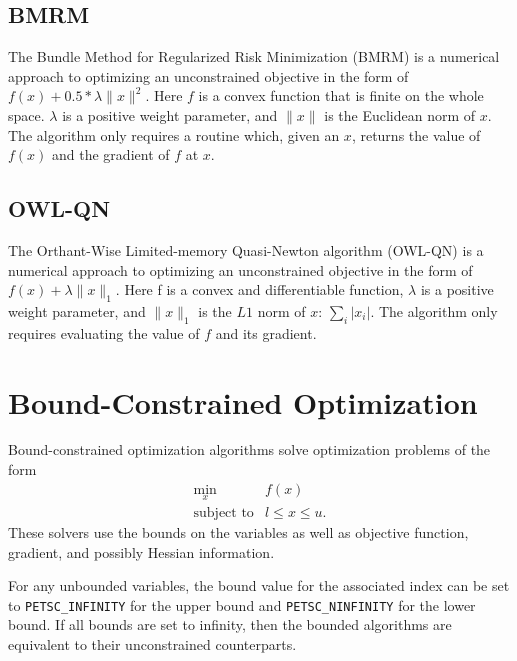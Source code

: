 \documentclass[]{book}
\begin{document}
\subsection{BMRM}%
The Bundle Method for Regularized Risk Minimization (BMRM)\cite{brmrm} is a 
numerical approach to optimizing an unconstrained objective in the form of 
$f(x) + 0.5 * \lambda \| x \|^2$.  Here $f$ is a convex function that is finite on 
the whole space.  $\lambda$ is a positive 
weight parameter, and $\| x \|$ is the Euclidean norm of $x$.  The algorithm only 
requires a routine which, given an $x$, returns the value of $f(x)$ and the 
gradient of $f$ at $x$.

\subsection{OWL-QN}%
The Orthant-Wise Limited-memory Quasi-Newton algorithm (OWL-QN)\cite{owlqn}
is a numerical approach to optimizing an unconstrained objective in the 
form of $f(x) + \lambda \|x\|_1$.  Here f is a convex and differentiable 
function, $\lambda$ is a positive weight parameter, and $\| x \|_1$ is the 
$L1$ norm of $x$: $\sum_i |x_i|$.  The algorithm only requires evaluating the 
value of $f$ and its gradient.

\section{Bound-Constrained Optimization}%
\label{chapter:bound}

Bound-constrained optimization algorithms solve optimization problems of the form
\[
\begin{array}{ll} \displaystyle
\min_{x} & f(x) \\
\mbox{subject to} & l \leq x \leq u.
\end{array}
\]
These solvers use the bounds on the variables as well as objective
function, gradient, and possibly Hessian information.

For any unbounded variables, the bound value for the associated index can be set 
to {\tt PETSC\_INFINITY} for the upper bound and {\tt PETSC\_NINFINITY} for the lower 
bound. If all bounds are set to infinity, then the bounded algorithms are equivalent 
to their unconstrained counterparts.
\end{document}
